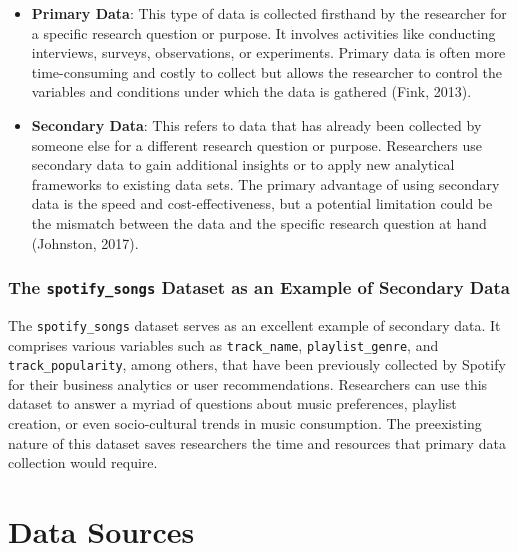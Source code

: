 \documentclass[
  b5paper]{book}
\begin{document}
\begin{itemize}
\item
  \textbf{Primary Data}: This type of data is collected firsthand by the researcher for a specific research question or purpose. It involves activities like conducting interviews, surveys, observations, or experiments. Primary data is often more time-consuming and costly to collect but allows the researcher to control the variables and conditions under which the data is gathered (Fink, 2013).
\item
  \textbf{Secondary Data}: This refers to data that has already been collected by someone else for a different research question or purpose. Researchers use secondary data to gain additional insights or to apply new analytical frameworks to existing data sets. The primary advantage of using secondary data is the speed and cost-effectiveness, but a potential limitation could be the mismatch between the data and the specific research question at hand (Johnston, 2017).
\end{itemize}

\hypertarget{the-spotify_songs-dataset-as-an-example-of-secondary-data}{%
\subsubsection*{\texorpdfstring{The \texttt{spotify\_songs} Dataset as an Example of Secondary Data}{The spotify\_songs Dataset as an Example of Secondary Data}}\label{the-spotify_songs-dataset-as-an-example-of-secondary-data}}

The \texttt{spotify\_songs} dataset serves as an excellent example of secondary data. It comprises various variables such as \texttt{track\_name}, \texttt{playlist\_genre}, and \texttt{track\_popularity}, among others, that have been previously collected by Spotify for their business analytics or user recommendations. Researchers can use this dataset to answer a myriad of questions about music preferences, playlist creation, or even socio-cultural trends in music consumption. The preexisting nature of this dataset saves researchers the time and resources that primary data collection would require.

\hypertarget{data-sources-1}{%
\section{Data Sources}\label{data-sources-1}}
\end{document}
